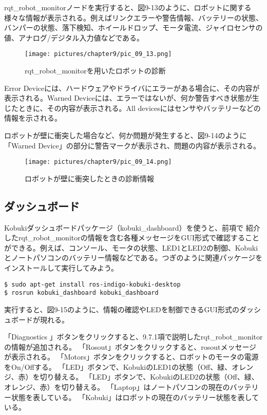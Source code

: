 rqt\_robot\_monitorノードを実行すると、図9-13のように、ロボットに関する様々な情報が表示される。例えばリンクエラーや警告情報、バッテリーの状態、バンパーの状態、落下検知、ホイールドロップ、モータ電流、ジャイロセンサの値、アナログ/デジタル入力値などである。

\begin{figure}[htp]
  \centering
  \texttt{[image: pictures/chapter9/pic\_09\_13.png]}
  \caption{rqt\_robot\_monitorを用いたロボットの診断}
\end{figure}

Error Deviceには、ハードウェアやドライバにエラーがある場合に、その内容が表示される。Warned Deviceには、エラーではないが、何か警告すべき状態が生じたときに、その内容が表示される。All devicesにはセンサやバッテリーなどの情報を示される。

ロボットが壁に衝突した場合など、何か問題が発生すると、図9-14のように「Warned Device」の部分に警告マークが表示され、問題の内容が表示される。

\begin{figure}[htp]
  \centering
  \texttt{[image: pictures/chapter9/pic\_09\_14.png]}
  \caption{ロボットが壁に衝突したときの診断情報}
\end{figure}

\subsection{ダッシュボード}

Kobukiダッシュボードパッケージ（kobuki\_dashboard）を使うと、前項で   紹介したrqt\_robot\_monitorの情報を含む各種メッセージをGUI形式で確認することができる。例えば、コンソール、モータの状態、LED1とLED2の制御、Kobukiとノートパソコンのバッテリー情報などである。つぎのように関連パッケージをインストールして実行してみよう。

\begin{lstlisting}[language=ROS]
$ sudo apt-get install ros-indigo-kobuki-desktop
$ rosrun kobuki_dashboard kobuki_dashboard
\end{lstlisting}

実行すると、図9-15のように、情報の確認やLEDを制御できるGUI形式のダッシュボードが現れる。

\setcounter{num}{0}
\circled{\thenum} 「Diagnostics   」ボタンをクリックすると、9.7.1項で説明したrqt\_robot\_monitor\\の情報が追加される。
\circled{\thenum}「Rosout」ボタンをクリックすると、rosoutメッセージが表示される。
\circled{\thenum}「Motors」ボタンをクリックすると、ロボットのモータの電源をOn/Offする。
\circled{\thenum}「LED」ボタンで、KobukiのLED1の状態（Off、緑、オレンジ、赤）を切り替える。
\circled{\thenum}「LED」ボタンで、KobukiのLED2の状態（Off、緑、オレンジ、赤）を切り替える。
\circled{\thenum}「Laptop」はノートパソコンの現在のバッテリー状態を表している。
\circled{\thenum}「Kobuki」はロボットの現在のバッテリー状態を表している。

